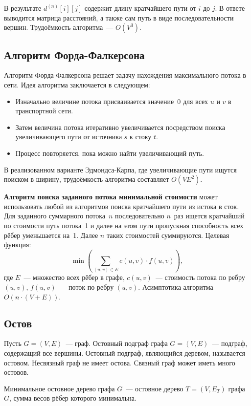\documentclass[a4paper,final]{article}
\begin{document}
В результате $d^{(n)}[i][j]$ содержит длину кратчайшего пути от $i$ до $j$. В ответе выводится матрица расстояний, а также сам путь в виде последовательности вершин. Трудоёмкость алгоритма~--- $O(V^3)$.

	\subsection{Алгоритм Форда-Фалкерсона}

Алгоритм Форда-Фалкерсона решает задачу нахождения максимального потока в сети. Идея алгоритма заключается в следующем:

\begin{itemize}
  \item Изначально величине потока присваивается значение~0 для всех $u$ и $v$ в транспортной сети.
  \item Затем величина потока итеративно увеличивается посредством поиска увеличивающего пути от источника $s$ к стоку $t$.
  \item Процесс повторяется, пока можно найти увеличивающий путь.
\end{itemize}

В реализованном варианте Эдмондса-Карпа, где увеличивающие пути ищутся поиском в ширину, трудоёмкость алгоритма составляет $O(VE^2)$.

\medskip
\noindent\textbf{Алгоритм поиска заданного потока минимальной стоимости} может использовать любой из алгоритмов поиска кратчайшего пути из истока в сток. Для заданного суммарного потока~$n$ последовательно $n$~раз ищется кратчайший по стоимости путь потока~1 и далее на этом пути пропускная способность всех рёбер уменьшается на~1. Далее $n$ таких стоимостей суммируются. Целевая функция:
\[
\min\!\left(\sum_{(u,v)\in E} c(u,v)\cdot f(u,v)\right),
\]
где $E$~--- множество всех рёбер в графе, $c(u,v)$~--- стоимость потока по ребру $(u,v)$, $f(u,v)$~--- поток по ребру $(u,v)$. Асимптотика алгоритма~--- $O(n \cdot (V+E))$.

	\subsection{Остов}

Пусть $G = (V, E)$~--- граф. Остовный подграф графа $G = (V, E)$~--- подграф, содержащий все вершины. Остовный подграф, являющийся деревом, называется остовом. Несвязный граф не имеет остова. Связный граф может иметь много остовов.

Минимальное остовное дерево графа $G$~--- остовное дерево $T = (V, E_T)$ графа $G$, сумма весов рёбер которого минимальна.
\end{document}
